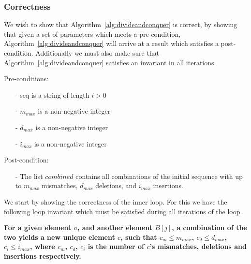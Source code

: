 \documentclass[12pt]{article}
\theoremstyle{definition}
\begin{document}
\subsubsection{Correctness}

We wish to show that Algorithm~\ref{alg:divideandconquer} is correct, by showing that given a set of parameters which meets a pre-condition, Algorithm~\ref{alg:divideandconquer} will arrive at a result which satisfies a post-condition. Additionally we must also make sure that Algorithm~\ref{alg:divideandconquer} satisfies an invariant in all iterations.

Pre-conditions:
\begin{itemize}
\item[-] seq is a string of length $i > 0$
\item[-] $m_{max}$ is a non-negative integer
\item[-] $d_{max}$ is a non-negative integer
\item[-] $i_{max}$ is a non-negative integer
\end{itemize}

Post-condition:
\begin{itemize}
\item[-] The list $combined$ contains all combinations of the initial sequence with up to  $m_{max}$ mismatches, $d_{max}$ deletions, and $i_{max}$ insertions.
\end{itemize}


We start by showing the correctness of the inner loop. For this we have the following loop invariant which must be satisfied during all iterations of the loop.

\textbf{For a given element $a$, and another element $B[j]$, a combination of the two yields a new unique element $c$, such that $c_m \leq m_{max}$, $c_d \leq d_{max}$, $c_i \leq i_{max}$, where $c_m$, $c_d$, $c_i$ is the number of $c$'s mismatches, deletions and insertions respectively.}
\end{document}
